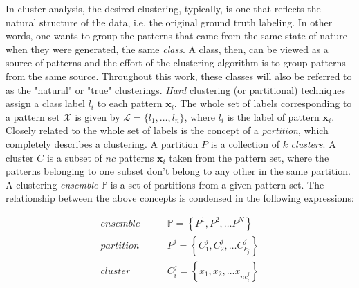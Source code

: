 In cluster analysis, the desired clustering, typically, is one that reflects the natural structure of the data, i.e. the original ground truth labeling.
In other words, one wants to group the patterns that came from the same state of nature when they were generated, the same \emph{class}.
A class, then, can be viewed as a source of patterns and the effort of the clustering algorithm is to group patterns from the same source.
Throughout this work, these classes will also be referred to as the "natural" or "true" clusterings.
\emph{Hard} clustering (or partitional) techniques assign a class label $l_i$ to each pattern $\mathbf{x}_i$.
The whole set of labels corresponding to a pattern set $\mathcal{X}$ is given by $\mathcal{L} = \{ l_1, \ldots, l_n \}$, where $l_i$ is the label of pattern $\mathbf{x}_i$.
Closely related to the whole set of labels is the concept of a \emph{partition}, which completely describes a clustering.
A partition $P$ is a collection of $k$ \emph{clusters}.
A cluster $C$ is a subset of $nc$ patterns $\mathbf{x}_i$ taken from the pattern set, where the patterns belonging to one subset don't belong to any other in the same partition.
A clustering \emph{ensemble} $\mathbb{P}$ is a set of partitions from a given pattern set.
The relationship between the above concepts is condensed in the following expressions:

\begin{align*}
    ensemble \qquad & \mathbb{P} = \left \{   P^1, P^2, \ldots P^N   \right \}  \\
    partition \qquad & P^j = \left \{   C^j_1, C^j_2, \ldots C^{j}_{k_j}   \right \}  \\
    cluster \qquad & C^j_i = \left \{   x_1, x_2, \ldots x_{nc^j_i}   \right \}
\end{align*}




